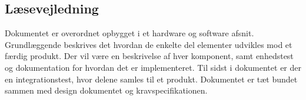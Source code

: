 \subsection{Læsevejledning}
Dokumentet er overordnet opbygget i et hardware og software afsnit. Grundlæggende beskrives det hvordan de enkelte del elementer udvikles mod et færdig produkt. Der vil være en beskrivelse af hver komponent, samt enhedstest og dokumentation for hvordan det er implementeret. Til sidst i dokumentet er der en integrationstest, hvor delene samles til et produkt. Dokumentet er tæt bundet sammen med design dokumentet og kravspecifikationen.